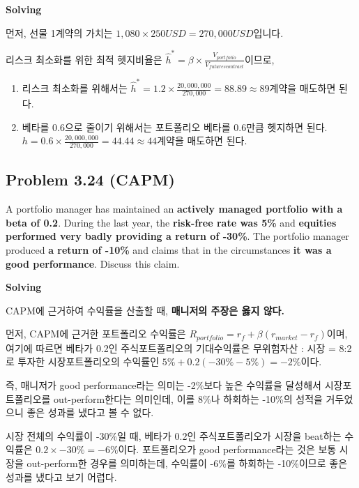 \documentclass[
  letterpaper,
  DIV=11,
  numbers=noendperiod]{scrreprt}
\begin{document}
\textbf{Solving}

먼저, 선물 1계약의 가치는 \(1,080\times 250USD=270,000USD\)입니다.

리스크 최소화를 위한 최적 헷지비율은
\(\hat{h}^*=\beta\times\frac{V_{portfolio}}{V_{futures contract}}\)이므로,

\begin{enumerate}
\def\labelenumi{(\arabic{enumi})}
\item
  리스크 최소화를 위해서는
  \(\hat{h}^*=1.2\times\frac{20,000,000}{270,000}=88.89\approx 89계약\)을
  매도하면 된다.
\item
  베타를 0.6으로 줄이기 위해서는 포트폴리오 베타를 0.6만큼 헷지하면
  된다. \(h=0.6\times\frac{20,000,000}{270,000}=44.44\approx 44계약\)을
  매도하면 된다.
\end{enumerate}

\subsection*{\texorpdfstring{\textbf{Problem 3.24}
(CAPM)}{Problem 3.24 (CAPM)}}\label{problem-3.24-capm}

A portfolio manager has maintained an \textbf{actively managed portfolio
with a beta of 0.2}. During the last year, the \textbf{risk-free rate
was 5\%} and \textbf{equities performed very badly providing a return of
-30\%}. The portfolio manager produced \textbf{a return of -10\%} and
claims that in the circumstances \textbf{it was a good performance}.
Discuss this claim.

\textbf{Solving}

CAPM에 근거하여 수익률을 산출할 때, \textbf{매니저의 주장은 옳지 않다.}

먼저, CAPM에 근거한 포트폴리오 수익률은
\(R_{portfolio}=r_f+\beta(r_{market}-r_f)\)이며, 여기에 따르면 베타가
0.2인 주식포트폴리오의 기대수익률은 무위험자산 : 시장 = 8:2로 투자한
시장포트폴리오의 수익률인 \(5\% + 0.2(-30\%-5\%)=-2\%\)이다.

즉, 매니저가 good performance라는 의미는 -2\%보다 높은 수익률을 달성해서
시장포트폴리오를 out-perform한다는 의미인데, 이를 8\%나 하회하는 -10\%의
성적을 거두었으니 좋은 성과를 냈다고 볼 수 없다.

\begin{tcolorbox}[enhanced jigsaw, toprule=.15mm, breakable, left=2mm, leftrule=.75mm, opacitybacktitle=0.6, coltitle=black, rightrule=.15mm, colback=white, titlerule=0mm, bottomtitle=1mm, colframe=quarto-callout-warning-color-frame, title=\textcolor{quarto-callout-warning-color}{\faExclamationTriangle}\hspace{0.5em}{잘못푼 예시}, toptitle=1mm, arc=.35mm, colbacktitle=quarto-callout-warning-color!10!white, opacityback=0, bottomrule=.15mm]

시장 전체의 수익률이 -30\%일 때, 베타가 0.2인 주식포트폴리오가 시장을
beat하는 수익률은 \(0.2\times -30\% =-6\%\)이다. 포트폴리오가 good
performance라는 것은 보통 시장을 out-perform한 경우를 의미하는데,
수익률이 -6\%를 하회하는 -10\%이므로 좋은 성과를 냈다고 보기 어렵다.

\end{tcolorbox}
\end{document}
